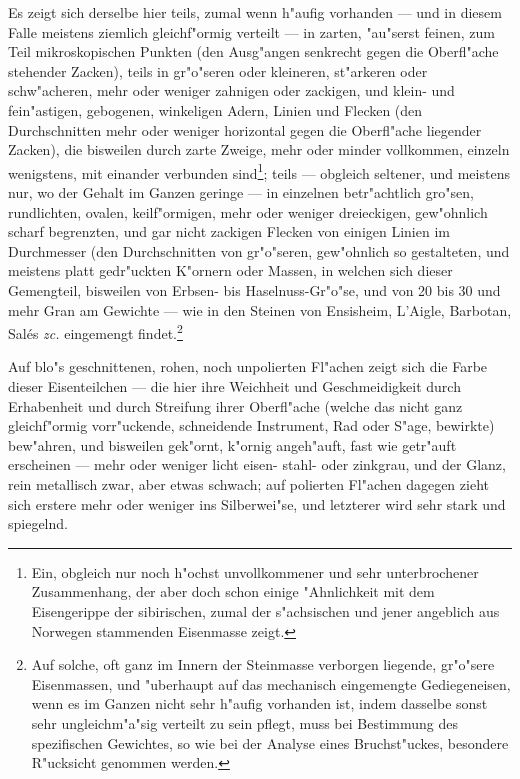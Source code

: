 \documentclass[a4paper, 11pt, oneside, german]{article}
\begin{document}
Es zeigt sich derselbe hier teils, zumal wenn h"aufig vorhanden --- und in diesem Falle meistens ziemlich gleichf"ormig verteilt --- in zarten, "au"serst feinen, zum Teil mikroskopischen Punkten (den Ausg"angen senkrecht gegen die Oberfl"ache stehender Zacken), teils in gr"o"seren oder kleineren, st"arkeren oder schw"acheren, mehr oder weniger zahnigen oder zackigen, und klein- und fein"astigen, gebogenen, winkeligen Adern, Linien und Flecken (den Durchschnitten mehr oder weniger horizontal gegen die Oberfl"ache liegender Zacken), die bisweilen durch zarte Zweige, mehr oder minder vollkommen, einzeln wenigstens, mit einander verbunden sind\footnote{Ein, obgleich nur noch h"ochst unvollkommener und sehr unterbrochener Zusammenhang, der aber doch schon einige "Ahnlichkeit mit dem Eisengerippe der sibirischen, zumal der s"achsischen und jener angeblich aus Norwegen stammenden Eisenmasse zeigt.}; teils --- obgleich seltener, und meistens nur, wo der Gehalt im Ganzen geringe --- in einzelnen betr"achtlich gro"sen, rundlichten, ovalen, keilf"ormigen, mehr oder weniger dreieckigen, gew"ohnlich scharf begrenzten, und gar nicht zackigen Flecken von einigen Linien im Durchmesser (den Durchschnitten von gr"o"seren, gew"ohnlich so gestalteten, und meistens platt gedr"uckten K"ornern oder Massen, in welchen sich dieser Gemengteil, bisweilen von Erbsen- bis Haselnuss-Gr"o"se, und von 20 bis 30 und mehr Gran am Gewichte --- wie in den Steinen von Ensisheim, L'Aigle, Barbotan, Salés \emph{zc.} eingemengt findet.\footnote{Auf solche, oft ganz im Innern der Steinmasse verborgen liegende, gr"o"sere Eisenmassen, und "uberhaupt auf das mechanisch eingemengte Gediegeneisen, wenn es im Ganzen nicht sehr h"aufig vorhanden ist, indem dasselbe sonst sehr ungleichm"a"sig verteilt zu sein pflegt, muss bei Bestimmung des spezifischen Gewichtes, so wie bei der Analyse eines Bruchst"uckes, besondere R"ucksicht genommen werden.}

Auf blo"s geschnittenen, rohen, noch unpolierten Fl"achen zeigt sich die Farbe dieser Eisenteilchen --- die hier ihre Weichheit und Geschmeidigkeit durch Erhabenheit und durch Streifung ihrer Oberfl"ache (welche das nicht ganz gleichf"ormig vorr"uckende, schneidende Instrument, Rad oder S"age, bewirkte) bew"ahren, und bisweilen gek"ornt, k"ornig angeh"auft, fast wie getr"auft erscheinen --- mehr oder weniger licht eisen- stahl- oder zinkgrau, und der Glanz, rein metallisch zwar, aber etwas schwach; auf polierten Fl"achen dagegen zieht sich erstere mehr oder weniger ins Silberwei"se, und letzterer wird sehr stark und spiegelnd.
\end{document}
